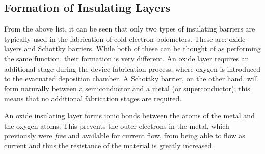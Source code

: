 \subsection{Formation of Insulating Layers}
\label{ssec:tunnelling-barreirs-formation}
From the above list, it can be seen that only two types of insulating barriers are typically used in the fabrication of cold-electron bolometers. These are: oxide layers and Schottky barriers. While both of these can be thought of as performing the same function, their formation is very different. An oxide layer requires an additional stage during the device fabrication process, where oxygen is introduced to the evacuated deposition chamber. A Schottky barrier, on the other hand, will form naturally between a semiconductor and a metal (or superconductor); this means that no additional fabrication stages are required.
\par 
An oxide insulating layer forms  ionic bonds between the atoms of the metal and the oxygen atoms. This prevents the outer electrons in the metal, which previously were \textit{free} and available for current flow, from being able to flow as current and thus the resistance of the material is greatly increased.
